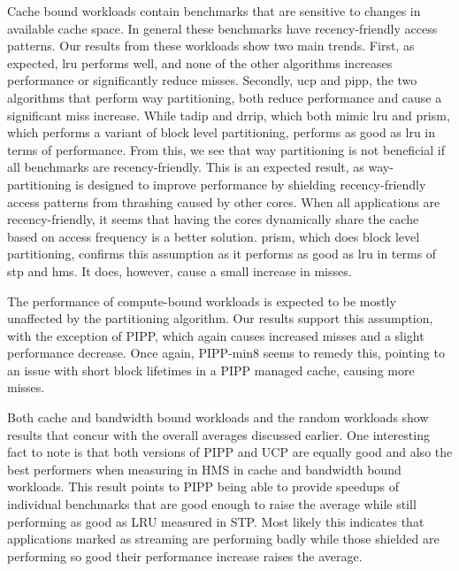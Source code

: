 Cache bound workloads contain benchmarks that are sensitive to changes in available cache space.
In general these benchmarks have recency-friendly access patterns.
Our results from these workloads show two main trends.
First, as expected, \gls{lru} performs well, and none of the other algorithms increases performance or significantly reduce misses.
Secondly, \gls{ucp} and \gls{pipp}, the two algorithms that perform way partitioning, both reduce performance and cause a significant miss increase. 
While \gls{tadip} and \gls{drrip}, which both mimic \gls{lru} and \gls{prism}, which performs a variant of block level partitioning, performs as good as \gls{lru} in terms of performance.
From this, we see that way partitioning is not beneficial if all benchmarks are recency-friendly.
This is an expected result, as way-partitioning is designed to improve performance by shielding recency-friendly access patterns from thrashing caused by other cores.
When all applications are recency-friendly, it seems that having the cores dynamically share the cache based on access frequency is a better solution.
\gls{prism}, which does block level partitioning, confirms this assumption as it performs as good as \gls{lru} in terms of \gls{stp} and \gls{hms}.
It does, however, cause a small increase in misses.

The performance of compute-bound workloads is expected to be mostly unaffected by the partitioning algorithm. 
Our results support this assumption, with the exception of PIPP, which again causes increased misses and a slight performance decrease.
Once again, PIPP-min8 seems to remedy this, pointing to an issue with short block lifetimes in a PIPP managed cache, causing more misses.

Both cache and bandwidth bound workloads and the random workloads show results that concur with the overall averages discussed earlier.
One interesting fact to note is that both versions of PIPP and UCP are equally good and also the best performers when measuring in HMS in cache and bandwidth bound workloads.
This result points to PIPP being able to provide speedups of individual benchmarks that are good enough to raise the average while still performing as good as LRU measured in STP.
Most likely this indicates that applications marked as streaming are performing badly while those shielded are performing so good their performance increase raises the average.

